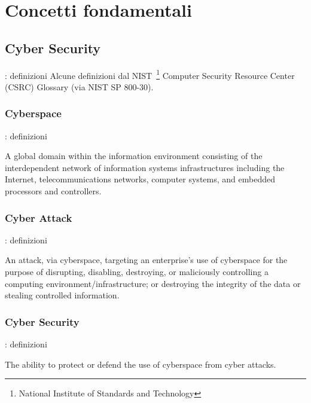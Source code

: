 \documentclass{beamer}
\begin{document}
\section{Concetti fondamentali}
\begin{frame}{\insertsection}
\end{frame}

\subsection{Cyber Security}
\begin{frame}{\insertsubsection: definizioni}
Alcune definizioni dal NIST~\footnote{National Institute of Standards
and Technology} Computer Security Resource Center (CSRC) Glossary (via
NIST SP 800-30).
\end{frame}

\subsubsection*{Cyberspace}
\begin{frame}{\insertsubsection: definizioni}{\insertsubsubsection}
\begin{block}{\insertsubsubsection}
A global domain within the information environment consisting of the
interdependent network of information systems infrastructures including
the Internet, telecommunications networks, computer systems, and
embedded processors and controllers.
\end{block}
\end{frame}

\subsubsection*{Cyber Attack}
\begin{frame}{\insertsubsection: definizioni}{\insertsubsubsection}
\begin{block}{\insertsubsubsection}
An \alert{attack}, via \alert{cyberspace}, targeting an enterprise's
use of cyberspace for the purpose of disrupting, disabling, destroying,
or maliciously controlling a computing environment/infrastructure; or
destroying the integrity of the data or stealing controlled
information.
\end{block}
\end{frame}

\subsubsection*{Cyber Security}
\begin{frame}{\insertsubsection: definizioni}{\insertsubsubsection}
\begin{block}{\insertsubsubsection}
The ability to protect or defend the use of \alert{cyberspace} from
\alert{cyber attacks}.
\end{block}
\end{frame}
\end{document}
